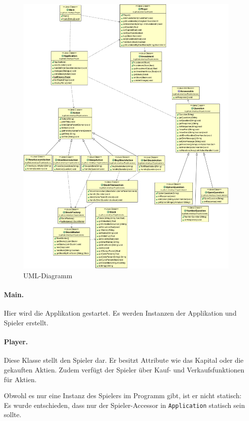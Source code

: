 \documentclass[paper=a4, fontsize=11pt]{article}
\numberwithin{equation}{section}		%
\numberwithin{figure}{section}			%
\numberwithin{table}{section}				%
\begin{document}
	\begin{figure}[!htbp]
		\centering
		\includegraphics[width=\linewidth]{UML1}
		\caption{UML-Diagramm}
		\label{fig:uml}
	\end{figure}
	
	\paragraph{Main.} Hier wird die Applikation gestartet. Es werden Instanzen der Applikation und Spieler erstellt.
	
	\paragraph{Player.} Diese Klasse stellt den Spieler dar. Er besitzt Attribute wie das Kapital oder die gekauften Aktien. Zudem verfügt der Spieler über Kauf- und Verkaufsfunktionen für Aktien.
	
	Obwohl es nur eine Instanz des Spielers im Programm gibt, ist er nicht statisch: Es wurde entschieden, dass nur der Spieler-Accessor in \texttt{Application} statisch sein sollte.
	
\end{document}
